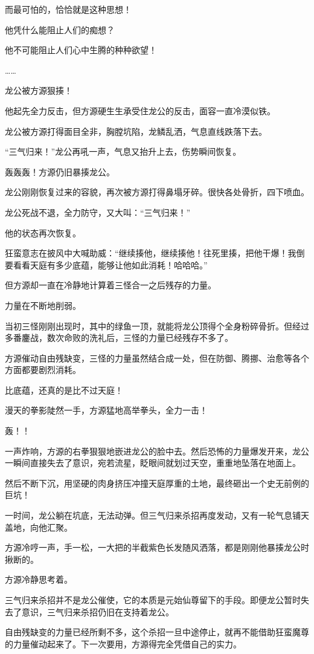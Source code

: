 \begin{this_body}
而最可怕的，恰恰就是这种思想！

他凭什么能阻止人们的痴想？

他不可能阻止人们心中生腾的种种欲望！

……

龙公被方源狠揍！

他起先全力反击，但方源硬生生承受住龙公的反击，面容一直冷漠似铁。

龙公被方源打得面目全非，胸膛坑陷，龙鳞乱洒，气息直线跌落下去。

“三气归来！”龙公再吼一声，气息又抬升上去，伤势瞬间恢复。

轰轰轰！方源仍旧暴揍龙公。

龙公刚刚恢复过来的容貌，再次被方源打得鼻塌牙碎。很快各处骨折，四下喷血。

龙公死战不退，全力防守，又大叫：“三气归来！”

他的状态再次恢复。

狂蛮意志在披风中大喊助威：“继续揍他，继续揍他！往死里揍，把他干爆！我倒要看看天庭有多少底蕴，能够让他如此消耗！哈哈哈。”

但方源却一直在冷静地计算着三怪合一之后残存的力量。

力量在不断地削弱。

当初三怪刚刚出现时，其中的绿鱼一顶，就能将龙公顶得个全身粉碎骨折。但经过多番鏖战，数次命败的洗礼后，三怪的力量已经残存不多了。

方源催动自由残缺变，三怪的力量虽然结合成一处，但在防御、腾挪、治愈等各个方面都要剧烈消耗。

比底蕴，还真的是比不过天庭！

漫天的拳影陡然一手，方源猛地高举拳头，全力一击！

轰！！

一声炸响，方源的右拳狠狠地嵌进龙公的脸中去。然后恐怖的力量爆发开来，龙公一瞬间直接失去了意识，宛若流星，眨眼间就划过天空，重重地坠落在地面上。

然后不断下沉，用坚硬的肉身挤压冲撞天庭厚重的土地，最终砸出一个史无前例的巨坑！

一时间，龙公躺在坑底，无法动弹。但三气归来杀招再度发动，又有一轮气息铺天盖地，向他汇聚。

方源冷哼一声，手一松，一大把的半截紫色长发随风洒落，都是刚刚他暴揍龙公时揪断的。

方源冷静思考着。

三气归来杀招并不是龙公催使，它的本质是元始仙尊留下的手段。即便龙公暂时失去了意识，三气归来杀招仍旧在支持着龙公。

自由残缺变的力量已经所剩不多，这个杀招一旦中途停止，就再不能借助狂蛮魔尊的力量催动起来了。下一次要用，方源得完全凭借自己的实力。


\end{this_body}

